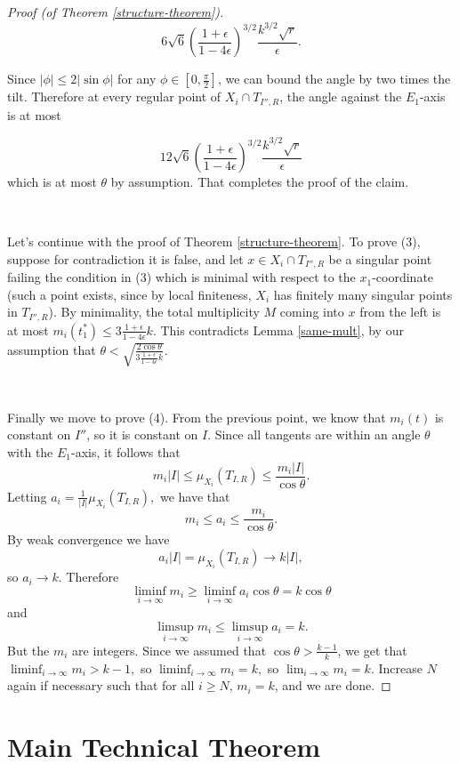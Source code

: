 \documentclass[11pt,reqno,twoside]{amsart}
\theoremstyle{definition}
\begin{document}
\begin{proof}[Proof (of Theorem \ref{structure-theorem})]
\[6\sqrt{6} \left(\frac{1+\epsilon}{1-4\epsilon}\right)^{3/2}  \frac{k^{3/2}\sqrt{r}}{\epsilon}. \]

Since $|\phi| \leq 2|\sin \phi|$ for any $\phi \in [0,\frac{\pi}{2}]$, we can bound the angle by two times the tilt. Therefore at every regular point of $X_i \cap T_{I'',R}$, the angle against the $E_1$-axis is at most

\[12\sqrt{6} \left(\frac{1+\epsilon}{1-4\epsilon}\right)^{3/2}  \frac{k^{3/2}\sqrt{r}}{\epsilon} \]
which is at most $\theta$ by assumption. That completes the proof of the claim.

\

Let's continue with the proof of Theorem \ref{structure-theorem}. To prove (3), suppose for contradiction it is false, and let $x \in X_i \cap T_{I'',R}$ be a singular point failing the condition in (3) which is minimal with respect to the $x_1$-coordinate (such a point exists, since by local finiteness, $X_i$ has finitely many singular points in $T_{I'',R}$). By minimality, the total multiplicity $M$ coming into $x$ from the left is at most $m_i(t_1^*) \leq 3\frac{1+\epsilon}{1-4\epsilon}k$. This contradicts Lemma \ref{same-mult}, by our assumption that $\theta < \sqrt{\frac{2\cos \theta}{3\frac{1+\epsilon}{1-4\epsilon}k}}$.

\ 

Finally we move to prove (4). From the previous point, we know that $m_i(t)$ is constant on $I''$, so it is constant on $I$. Since all tangents are within an angle $\theta$ with the $E_1$-axis, it follows that
\[m_i |I| \leq \mu_{X_i}(T_{I,R}) \leq \frac{m_i|I|}{\cos \theta}.\]
Letting $a_i = \frac{1}{|I|}\mu_{X_i}(T_{I,R}),$
we have that
\[m_i \leq a_i \leq \frac{m_i}{\cos \theta}.\]
 By weak convergence we have
\[a_i|I| = \mu_{X_i}(T_{I,R}) \to k|I|,\]
so $a_i \to k$. 
Therefore 
\[\liminf_{i \to \infty}m_i \geq \liminf_{i \to \infty} a_i \cos \theta  = k \cos \theta \]
and
\[\limsup_{i \to \infty}m_i \leq \limsup_{i \to \infty} a_i = k.\]
But the $m_i$ are integers. Since we assumed that $\cos \theta > \frac{k-1}{k}$, we get that 
$\liminf_{i \to \infty} m_i > k-1,$
so
$\liminf_{i \to \infty} m_i = k,$ so $\lim_{i \to \infty}m_i = k.$ Increase $N$ again if necessary such that for all $i \geq N$, $m_i = k$, and we are done.
\end{proof}

\section{Main Technical Theorem}
\label{sec:maintechnicaltheorem}
\end{document}
